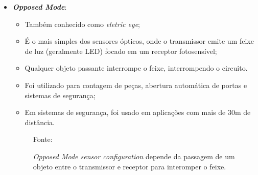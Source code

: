\documentclass[xcolor=dvipsnames, aspectratio=169]{beamer}
\begin{document}
\begin{frame}
\begin{itemize}
		\newpage
		\item \textbf{\textit{Opposed Mode}}:
		\begin{itemize}
			\item Também conhecido como \textit{eletric eye};
			\item É o mais simples dos sensores ópticos, onde o transmissor emite um feixe de luz (geralmente LED) focado em um receptor fotosensível;
			\item Qualquer objeto passante interrompe o feixe, interrompendo o circuito.
			\item Foi utilizado para contagem de peças, abertura automática de portas e sistemas de segurança;
			\item Em sistemas de segurança, foi usado em aplicações com mais de 30m de distância.
		\end{itemize}
		\begin{figure}
			\centering
			{Fonte: \cite{everett1995sensors}}
			\caption{\textit{Opposed Mode sensor configuration} depende da passagem de um objeto entre o transmissor e receptor para interomper o feixe.}
			\label{fig:8_optical_sensor_opposed_mode}
		\end{figure}


\end{itemize}
\end{frame}
\end{document}
